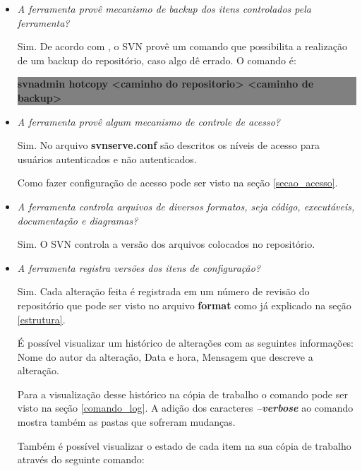 \begin{itemize}
  \item \textit{A ferramenta provê mecanismo de backup dos itens controlados pela ferramenta?}

    Sim. De acordo com , o SVN provê um comando que possibilita a realização de um backup do repositório, caso algo dê errado. O comando é:

    \begin{centering}
    \colorbox{Gray}{
    \begin{minipage}{420px}
      \textbf{svnadmin hotcopy <caminho do repositorio> <caminho de backup>}
    \end{minipage}
    }

    \end{centering}

  \item \textit{A ferramenta provê algum mecanismo de controle de acesso?}

    Sim. No arquivo \textbf{svnserve.conf} são descritos os níveis de acesso para usuários autenticados e não autenticados.\cite{svn-book}

    Como fazer configuração de acesso pode ser visto na seção \ref{secao_acesso}.
  \item \textit{A ferramenta controla arquivos de diversos formatos, seja código, executáveis, documentação e diagramas?}

    Sim. O SVN controla a versão dos arquivos colocados no repositório.

  \item \textit{A ferramenta registra versões dos itens de configuração?}

    Sim. Cada alteração feita é registrada em um número de revisão do repositório que pode ser visto no arquivo \textbf{format} como já explicado na seção \ref{estrutura}.

    É possível visualizar um histórico de alterações com as seguintes informações: Nome do autor da alteração, Data e hora, Mensagem que descreve a alteração. \cite{svn-book}

    Para a visualização desse histórico na cópia de trabalho o comando pode ser visto na seção \ref{comando_log}. A adição dos caracteres \textbf{\textit{--verbose}} ao comando mostra também as pastas que sofreram mudanças.

    Também é possível visualizar o estado de cada item na sua cópia de trabalho através do seguinte comando: \cite{svn-book}


\end{itemize}
